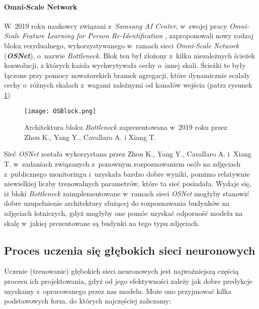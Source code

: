 \paragraph*{Omni-Scale Network}

W~2019 roku naukowcy związani z~\emph{Samsung AI Center}, w~swojej pracy \emph{Omni-Scale Feature Learning for Person Re-Identification} \cite{zhou}, zaproponowali nowy rodzaj bloku  rezydualnego, wykorzystywanego w~ramach sieci \emph{Omni-Scale Network} (\textbf{\emph{OSNet}}), o~nazwie \emph{Bottleneck}. Blok ten był złożony z~kilku niezależnych ścieżek konwolucji, z których każda wychwytywała cechy o~innej skali. Ścieżki te były łączone przy pomocy nowatorskich bramek agregacji, które dynamicznie scalały cechy o~różnych skalach z~wagami zależnymi od kanałów wejścia (patrz rysunek \ref{fig:osblock1})

\begin{figure}[!h]
    \centering \texttt{[image: OSBlock.png]}
    \captionsetup{format=hang}
    \caption{Architektura bloku \emph{Bottleneck} zaprezentowana w~2019 roku przez Zhou K., Yang Y., Cavallaro A. i Xiang T. \cite{zhou}}
    \label{fig:osblock1}
\end{figure}

Sieć \emph{OSNet} została wykorzystana przez Zhou K., Yang Y., Cavallaro A. i~Xiang T. w~zadaniach związanych z~ponownym rozpoznawaniem osób na zdjęciach z~publicznego monitoringu i~uzyskała bardzo dobre wyniki, pomimo relatywnie niewielkiej liczby trenowalnych parametrów, które ta sieć posiadała. Wydaje się, iż bloki \emph{Bottleneck} zaimplementowane w~ramach sieci \emph{OSNet} mogłyby stanowić dobre uzupełnienie architektury służącej do rozpoznawania budynków na zdjęciach lotniczych, gdyż mogłyby one pomóc uzyskać odporność modelu na skalę w~jakiej prezentowane są budynki na tego typu zdjęciach.

\newpage
\subsection{Proces uczenia się głębokich sieci neuronowych}

Uczenie (trenowanie) głębokich sieci neuronowych jest najważniejszą częścią procesu ich projektowania, gdyż od jego efektywności zależy jak dobre predykcje uzyskamy z~opracowanego przez nas modelu. Może ono przyjmować kilka podstawowych form, do których najczęściej zaliczamy:

